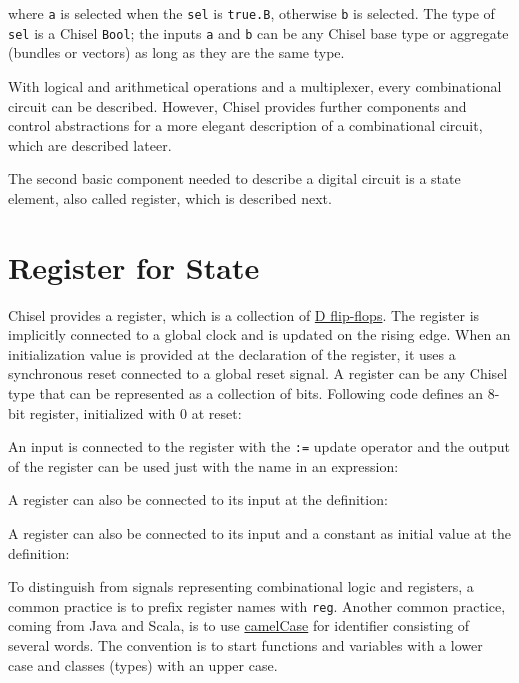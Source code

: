 \documentclass[%
    10pt, %
    headinclude, footexclude,
    openright, %
    notitlepage,
    cleardoubleempty,
    headsepline,
    pointlessnumbers,
    bibtotoc, idxtotoc,
    ]{scrbook}
\newcommand{\code}[1]{{\small{\texttt{#1}}}}
\newcommand{\myref}[2]{\href{#1}{#2}}
\begin{document}


\noindent where \code{a} is selected when the \code{sel} is \code{true.B}, otherwise \code{b}
is selected. The type of \code{sel} is a Chisel \code{Bool}; the inputs \code{a} and \code{b}
can be any Chisel base type or aggregate (bundles or vectors) as long as they are the same
type.

With logical and arithmetical operations and a multiplexer, every combinational
circuit can be described. However, Chisel provides further components and control abstractions
for a more elegant description of a combinational circuit, which are described lateer.

The second basic component needed to describe a digital circuit is a state element,
also called register, which is described next.



\section{Register for State}

Chisel provides a register, which is a collection of
\myref{https://en.wikipedia.org/wiki/Flip-flop\_(electronics)\#D\_flip-flop}{D flip-flops}.
The register is implicitly connected to a global clock and is updated on the rising edge.
When an initialization value is provided at the declaration of the register,
it uses a synchronous reset connected to a global reset signal.
A register can be any Chisel type that can be represented as a collection of bits.
Following code defines an 8-bit register, initialized with 0 at reset:



\noindent An input is connected to the register with the \code{:=} update operator and
the output of the register can be used just with the name in an expression:



\noindent A register can also be connected to its input at the definition:



\noindent A register can also be connected to its input and a constant as
initial value at the definition:



\noindent To distinguish from signals representing combinational logic and registers,
a common practice is to prefix register names with \code{reg}.
Another common practice, coming from Java and Scala, is to use
\myref{https://en.wikipedia.org/wiki/Camel_case}{camelCase} for
identifier consisting of several words. The convention is to start
functions and variables with a lower case and classes (types) with
an upper case.
\end{document}
